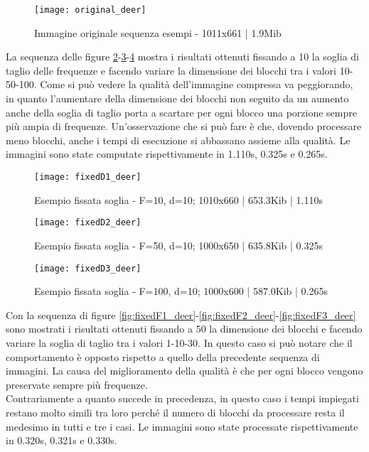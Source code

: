 \begin{figure}[H]
    \texttt{[image: original\_deer]}\centering
    \caption{Immagine originale sequenza esempi - 1011x661 | 1.9Mib}\label{fig:original_deer}
\end{figure}

La sequenza delle figure \ref{fig:fixedD1_deer}-\ref{fig:fixedD2_deer}-\ref{fig:fixedD3_deer} mostra i risultati ottenuti fissando a 10 la soglia di taglio delle frequenze e facendo variare la dimensione dei blocchi tra i valori 10-50-100. Come si può vedere la qualità dell'immagine compressa va peggiorando, in quanto l'aumentare della dimensione dei blocchi non seguito da un aumento anche della soglia di taglio porta a scartare per ogni blocco una porzione sempre più ampia di frequenze. Un'osservazione che si può fare è che, dovendo processare meno blocchi, anche i tempi di esecuzione si abbassano assieme alla qualità. Le immagini sono state computate rispettivamente in 1.110s, 0.325s e 0.265s.\\

\begin{figure}[H]
    \texttt{[image: fixedD1\_deer]}\centering
    \caption{Esempio fissata soglia - F=10, d=10; 1010x660 | 653.3Kib | 1.110s}\label{fig:fixedD1_deer}
\end{figure}
\begin{figure}[H]
    \texttt{[image: fixedD2\_deer]}\centering
    \caption{Esempio fissata soglia - F=50, d=10; 1000x650 | 635.8Kib | 0.325s}\label{fig:fixedD2_deer}
\end{figure}
\begin{figure}[H]
    \texttt{[image: fixedD3\_deer]}\centering
    \caption{Esempio fissata soglia - F=100, d=10; 1000x600 | 587.0Kib | 0.265s}\label{fig:fixedD3_deer}
\end{figure}

Con la sequenza di figure \ref{fig:fixedF1_deer}-\ref{fig:fixedF2_deer}-\ref{fig:fixedF3_deer} sono mostrati i risultati ottenuti fissando a 50 la dimensione dei blocchi e facendo variare la soglia di taglio tra i valori 1-10-30. In questo caso si può notare che il comportamento è opposto rispetto a quello della precedente sequenza di immagini. La causa del miglioramento della qualità è che per ogni blocco vengono preservate sempre più frequenze.\\
Contrariamente a quanto succede in precedenza, in questo caso i tempi impiegati restano molto simili tra loro perché il numero di blocchi da processare resta il medesimo in tutti e tre i casi. Le immagini sono state processate rispettivamente in 0.320s, 0.321s e 0.330s.

